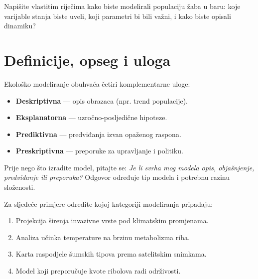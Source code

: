 \documentclass[12pt,oneside]{book}
\begin{document}
	\begin{tcolorbox}[colback=green!5,colframe=green!40!black,title={Zadatak 1}]
		Napišite vlastitim riječima kako biste modelirali populaciju žaba u baru: 
		koje varijable stanja biste uveli, koji parametri bi bili važni, i kako biste opisali dinamiku?
	\end{tcolorbox}
	
	\section{Definicije, opseg i uloga}
	\label{sec:definicije-ulogea}
	
	Ekološko modeliranje obuhvaća četiri komplementarne uloge:
	
	\begin{itemize}
		\item \textbf{Deskriptivna} --- opis obrazaca (npr. trend populacije).
		\item \textbf{Eksplanatorna} --- uzročno-posljedične hipoteze.
		\item \textbf{Prediktivna} --- predviđanja izvan opaženog raspona.
		\item \textbf{Preskriptivna} --- preporuke za upravljanje i politiku.
	\end{itemize}
	
	\begin{tcolorbox}[colback=yellow!10,colframe=orange!80!black,title={Savjet}]
		Prije nego što izradite model, pitajte se: 
		\emph{Je li svrha mog modela opis, objašnjenje, predviđanje ili preporuka?} 
		Odgovor određuje tip modela i potrebnu razinu složenosti.
	\end{tcolorbox}
	
	\begin{tcolorbox}[colback=green!5,colframe=green!40!black,title={Zadatak 2}]
		Za sljedeće primjere odredite kojoj kategoriji modeliranja pripadaju:  
		\begin{enumerate}
			\item Projekcija širenja invazivne vrste pod klimatskim promjenama.  
			\item Analiza učinka temperature na brzinu metabolizma riba.  
			\item Karta raspodjele šumskih tipova prema satelitskim snimkama.  
			\item Model koji preporučuje kvote ribolova radi održivosti.  
		\end{enumerate}
	\end{tcolorbox}
	
\end{document}
